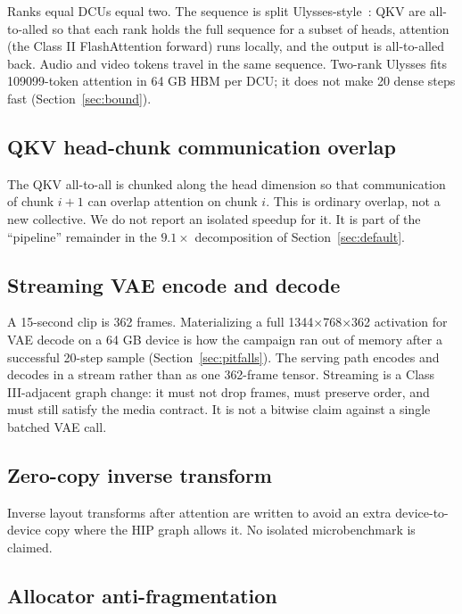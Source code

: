 \documentclass[11pt]{article}
\begin{document}
Ranks equal DCUs equal two. The sequence is split Ulysses-style~\cite{6}: QKV are all-to-alled so that each rank holds the full sequence for a subset of heads, attention (the Class II FlashAttention forward) runs locally, and the output is all-to-alled back. Audio and video tokens travel in the same sequence. Two-rank Ulysses fits 109099-token attention in 64 GB HBM per DCU; it does not make 20 dense steps fast (Section~\ref{sec:bound}).

\subsection{QKV head-chunk communication overlap}
\label{sec:overlap}

The QKV all-to-all is chunked along the head dimension so that communication of chunk $i{+}1$ can overlap attention on chunk $i$. This is ordinary overlap, not a new collective. We do not report an isolated speedup for it. It is part of the ``pipeline'' remainder in the $9.1\times$ decomposition of Section~\ref{sec:default}.

\subsection{Streaming VAE encode and decode}
\label{sec:vae}

A 15-second clip is 362 frames. Materializing a full 1344$\times$768$\times$362 activation for VAE decode on a 64 GB device is how the campaign ran out of memory after a successful 20-step sample (Section~\ref{sec:pitfalls}). The serving path encodes and decodes in a stream rather than as one 362-frame tensor. Streaming is a Class III-adjacent graph change: it must not drop frames, must preserve order, and must still satisfy the media contract. It is not a bitwise claim against a single batched VAE call.

\subsection{Zero-copy inverse transform}
\label{sec:zerocopy}

Inverse layout transforms after attention are written to avoid an extra device-to-device copy where the HIP graph allows it. No isolated microbenchmark is claimed.

\subsection{Allocator anti-fragmentation}
\label{sec:allocator}
\end{document}
